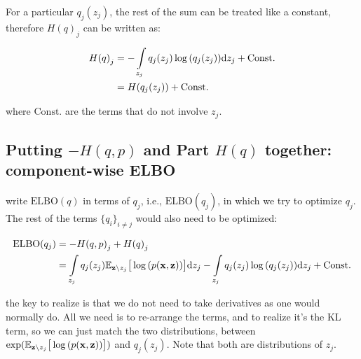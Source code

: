 \documentclass{article}
\def\C{\text{Const.}}
\begin{document}
For a particular $q_j(z_j)$, the rest of the sum can be treated like a constant, therefore ${H(q)}_{j}$ can be written as:

\begin{equation}\begin{split}
{H(q)}_{j} &= - \int\limits_{z_j} q_j(z_j) \log { (q_j(z_j))} \d z_j + \C\\
&= H ( q_j(z_j) )  + \C\\
\end{split}\end{equation}

where $\C$ are the terms that do not involve $z_j$.

\subsection{Putting $- H(q,p)$ and Part $H(q)$ together: component-wise ELBO} 

write $ \text{ELBO}(q)$ in terms of $q_j$, i.e., $ \text{ELBO}(q_j)$, in which we try to optimize $q_j$. The rest of the terms $\{ q_i \}_{i \ne j}$ would also need to be optimized:

\begin{equation}\begin{split}\label{eq ELBO qj}
\text{ELBO}(q_j) &= {- H(q,p)}_{j} + {H(q)}_{j}\\
&= \int\limits_{z_j} q_j(z_j)  \E_{\z \setminus z_j} \big[ \log{(p(\x,\z))} \big]   \d z_j - \int\limits_{z_j} q_j(z_j) \log { (q_j(z_j))} \d z_j + \C\\
 \end{split}\end{equation}

the key to realize is that we do not need to take derivatives as one would normally do. All we need is to re-arrange the terms, and to realize it's the KL term, so we can just match the two distributions, between $\exp(\mathbb{E}_{{\mathbf z} \setminus z_j} \big[ \log{(p({\mathbf x},{\mathbf z}))} \big]  )$ and $q_j(z_j)$. Note that both are distributions of $z_j$.


%
\end{document}
